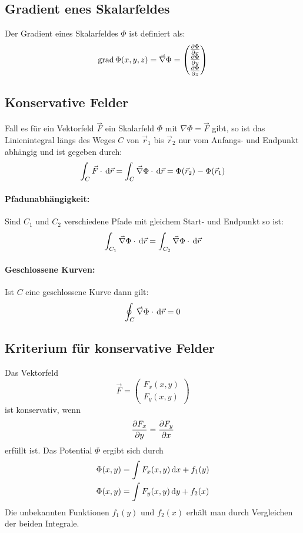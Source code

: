 \subsection{Gradient enes Skalarfeldes}
Der Gradient eines Skalarfeldes $\Phi$ ist definiert als:
\[ \operatorname{grad}\Phi(x,y,z)=\vec{\nabla}\Phi = \begin{pmatrix}
	\frac{\partial \Phi}{\partial x} \\ \frac{\partial \Phi}{\partial y} \\ \frac{\partial \Phi}{\partial z} \end{pmatrix} \]
	
\subsection{Konservative Felder}
Fall es für ein Vektorfeld $\vec{F}$ ein Skalarfeld $\Phi$ mit $\nabla\Phi = \vec{F}$
gibt, so ist das Linienintegral längs des Weges $C$ von $\vec{r}_1$ bis $\vec{r}_2$ nur
vom Anfangs- und Endpunkt abhängig und ist gegeben durch:
\[ \int_C \vec{F}\cdot\,\mathrm{d}\vec{r} = \int_C \vec{\nabla}\Phi\cdot\,\mathrm{d}\vec{r}
	= \Phi(\vec{r}_2) - \Phi(\vec{r}_1) \]
	
\paragraph{Pfadunabhängigkeit:}
Sind $C_1$ und $C_2$ verschiedene Pfade mit gleichem Start- und Endpunkt so ist:
\[ \int_{C_1} \vec{\nabla}\Phi\cdot\,\mathrm{d}\vec{r} = \int_{C_2} \vec{\nabla}\Phi\cdot\,\mathrm{d}\vec{r} \]	

\paragraph{Geschlossene Kurven:} Ist $C$ eine geschlossene Kurve dann gilt:
\[ \oint_C \vec{\nabla}\Phi\cdot\,\mathrm{d}\vec{r} =0 \]

\subsection{Kriterium für konservative Felder}
Das Vektorfeld
\[ \vec{F} = \begin{pmatrix} F_x(x,y) \\ F_y(x,y) \end{pmatrix} \]
ist konservativ, wenn
\[ \frac{\partial F_x}{\partial y} = \frac{\partial F_y}{\partial x} \]
erfüllt ist. Das Potential $\Phi$ ergibt sich durch
\[\begin{aligned}
		\Phi(x,y) &= \int F_x(x,y)\,\mathrm{d} x +f_1(y)\\
		\Phi(x,y) &= \int F_y(x,y)\,\mathrm{d} y +f_2(x)\\
\end{aligned}\]
Die unbekannten Funktionen $f_1(y)$ und $f_2(x)$ erhält man durch Vergleichen der beiden
Integrale.

